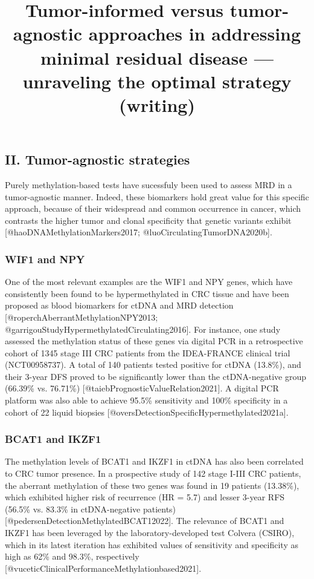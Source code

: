 \documentclass[
]{article}
\title{Tumor-informed versus tumor-agnostic approaches in addressing
minimal residual disease --- unraveling the optimal strategy (writing)}
\author{}
\date{}
\begin{document}
\maketitle

\subsection{II. Tumor-agnostic
strategies}\label{ii.-tumor-agnostic-strategies}

Purely methylation-based tests have sucessfuly been used to assess MRD
in a tumor-agnostic manner. Indeed, these biomarkers hold great value
for this specific approach, because of their widespread and common
occurrence in cancer, which contrasts the higher tumor and clonal
specificity that genetic variants exhibit
{[}@haoDNAMethylationMarkers2017; @luoCirculatingTumorDNA2020b{]}.

\subsubsection{WIF1 and NPY}\label{wif1-and-npy}

One of the most relevant examples are the WIF1 and NPY genes, which have
consistently been found to be hypermethylated in CRC tissue and have
been proposed as blood biomarkers for ctDNA and MRD detection
{[}@roperchAberrantMethylationNPY2013;
@garrigouStudyHypermethylatedCirculating2016{]}. For instance, one study
assessed the methylation status of these genes via digital PCR in a
retrospective cohort of 1345 stage III CRC patients from the IDEA-FRANCE
clinical trial (NCT00958737). A total of 140 patients tested positive
for ctDNA (13.8\%), and their 3-year DFS proved to be significantly
lower than the ctDNA-negative group (66.39\% vs. 76.71\%)
{[}@taiebPrognosticValueRelation2021{]}. A digital PCR platform was also
able to achieve 95.5\% sensitivity and 100\% specificity in a cohort of
22 liquid biopsies {[}@oversDetectionSpecificHypermethylated2021a{]}.

\subsubsection{BCAT1 and IKZF1}\label{bcat1-and-ikzf1}

The methylation levels of BCAT1 and IKZF1 in ctDNA has also been
correlated to CRC tumor presence. In a prospective study of 142 stage
I-III CRC patients, the aberrant methylation of these two genes was
found in 19 patients (13.38\%), which exhibited higher risk of
recurrence (HR = 5.7) and lesser 3-year RFS (56.5\% vs. 83.3\% in
ctDNA-negative patients) {[}@pedersenDetectionMethylatedBCAT12022{]}.
The relevance of BCAT1 and IKZF1 has been leveraged by the
laboratory-developed test Colvera (CSIRO), which in its latest iteration
has exhibited values of sensitivity and specificity as high as 62\% and
98.3\%, respectively
{[}@vuceticClinicalPerformanceMethylationbased2021{]}.
\end{document}
